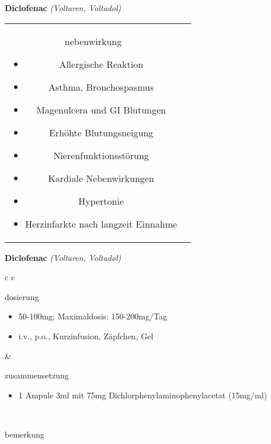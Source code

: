 \documentclass[12pt]{beamer}
\begin{document}
\begin{frame}{
    \textbf{Diclofenac}
    \textit{(Voltaren, Voltadol)}
}
\begin{tabular}{c c}
\begin{beamercolorbox}[wd=\boxwidth\textwidth,ht=\boxheight\textheight,sep=1em]{nebenwirkung}
            \scriptsize
            \begin{itemize}
                \item Allergische Reaktion
                \item Asthma, Bronchospasmus
                \item Magenulcera und GI Blutungen
                \item Erhöhte Blutungsneigung
                \item Nierenfunktionsstörung
                \item Kardiale Nebenwirkungen
                \item Hypertonie
                \item Herzinfarkte nach langzeit Einnahme
            \end{itemize}
        \end{beamercolorbox} \\
    \end{tabular}
\end{frame}

\begin{frame}{
    \textbf{Diclofenac}
    \textit{(Voltaren, Voltadol)}
}
    \begin{tabular}{c c}
        \begin{beamercolorbox}[wd=\boxwidth\textwidth,ht=\boxheight\textheight,sep=1em]{dosierung}
            \begin{itemize}
                \item 50-100mg; Maximaldosis: 150-200mg/Tag
                \item i.v., p.o., Kurzinfusion, Zäpfchen, Gel	
            \end{itemize}
        \end{beamercolorbox} & 
        \begin{beamercolorbox}[wd=\boxwidth\textwidth,ht=\boxheight\textheight,sep=1em]{zusammensetzung}
            \begin{itemize}
                \item 1 Ampule 3ml mit 75mg Dichlorphenylaminophenylacetat (15mg/ml)
            \end{itemize}
        \end{beamercolorbox} \\
        \begin{beamercolorbox}[wd=\textwidth,ht=\boxheight\textheight,sep=1em]{bemerkung}
        \end{beamercolorbox} \\
    \end{tabular}
\end{frame}
\end{document}
